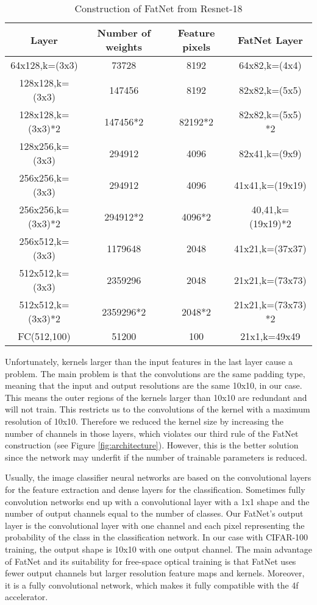 \documentclass{article}
\begin{document}
\begin{table}[H]
\caption{Construction of FatNet from Resnet-18}
\centering
\begin{tabular}{cccc}
\toprule
\textbf{Layer}	& \textbf{Number of weights}	& \textbf{Feature pixels} & \textbf{FatNet Layer}\\
\midrule
64x128,k=(3x3)    & 73728             & 8192             & 64x82,k=(4x4)      \\
128x128,k=(3x3)   & 147456            & 8192             & 82x82,k=(5x5)      \\
128x128,k=(3x3)*2 & 147456*2          & 82192*2          & 82x82,k=(5x5) *2   \\
128x256,k=(3x3)   & 294912            & 4096             & 82x41,k=(9x9)      \\
256x256,k=(3x3)   & 294912            & 4096             & 41x41,k=(19x19)    \\
256x256,k=(3x3)*2 & 294912*2          & 4096*2           & 40,41,k=(19x19)*2  \\
256x512,k=(3x3)   & 1179648           & 2048             & 41x21,k=(37x37)    \\
512x512,k=(3x3)   & 2359296           & 2048             & 21x21,k=(73x73)    \\
512x512,k=(3x3)*2 & 2359296*2         & 2048*2           & 21x21,k=(73x73) *2 \\
FC(512,100)       & 51200             & 100              & 21x1,k=49x49       \\ \bottomrule
\end{tabular}
\label{tabFatNetconstruction}
\end{table}
\unskip


Unfortunately, kernels larger than the input features in the last layer cause a problem. The main problem is that the convolutions are the same padding type, meaning that the input and output resolutions are the same 10x10, in our case. This means the outer regions of the kernels larger than 10x10 are redundant and will not train. This restricts us to the convolutions of the kernel with a maximum resolution of 10x10. Therefore we reduced the kernel size by increasing the number of channels in those layers, which violates our third rule of the FatNet construction (see Figure \ref{fig:architecture}). However, this is the better solution since the network may underfit if the number of trainable parameters is reduced. 

Usually, the image classifier neural networks are based on the convolutional layers for the feature extraction and dense layers for the classification. Sometimes fully convolution networks end up with a convolutional layer with a 1x1 shape and the number of output channels equal to the number of classes. Our FatNet's output layer is the convolutional layer with one channel and each pixel representing the probability of the class in the classification network. In our case with CIFAR-100 training, the output shape is 10x10 with one output channel. The main advantage of FatNet and its suitability for free-space optical training is that FatNet uses fewer output channels but larger resolution feature maps and kernels. Moreover, it is a fully convolutional network, which makes it fully compatible with the 4f accelerator.
\end{document}
